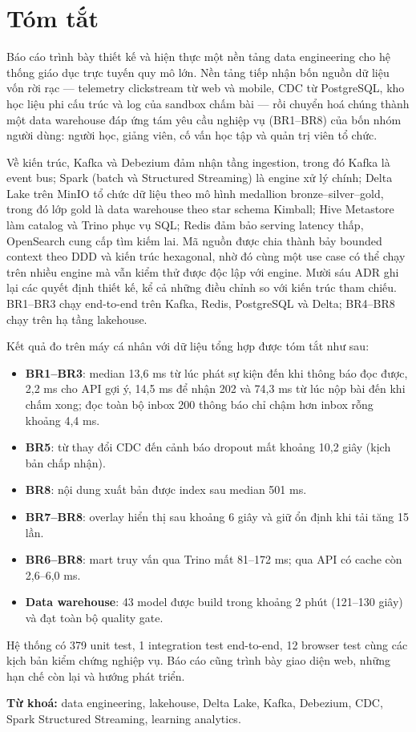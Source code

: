 \chapter*{Tóm tắt}

Báo cáo trình bày thiết kế và hiện thực một nền tảng data engineering cho hệ thống giáo dục trực tuyến quy mô lớn. Nền tảng tiếp nhận bốn nguồn dữ liệu vốn rời rạc --- telemetry clickstream từ web và mobile, CDC từ PostgreSQL, kho học liệu phi cấu trúc và log của sandbox chấm bài --- rồi chuyển hoá chúng thành một data warehouse đáp ứng tám yêu cầu nghiệp vụ (BR1--BR8) của bốn nhóm người dùng: người học, giảng viên, cố vấn học tập và quản trị viên tổ chức.

Về kiến trúc, Kafka và Debezium đảm nhận tầng ingestion, trong đó Kafka là event bus; Spark (batch và Structured Streaming) là engine xử lý chính; Delta Lake trên MinIO tổ chức dữ liệu theo mô hình medallion bronze--silver--gold, trong đó lớp gold là data warehouse theo star schema Kimball; Hive Metastore làm catalog và Trino phục vụ SQL; Redis đảm bảo serving latency thấp, OpenSearch cung cấp tìm kiếm lai. Mã nguồn được chia thành bảy bounded context theo DDD và kiến trúc hexagonal, nhờ đó cùng một use case có thể chạy trên nhiều engine mà vẫn kiểm thử được độc lập với engine. Mười sáu ADR ghi lại các quyết định thiết kế, kể cả những điều chỉnh so với kiến trúc tham chiếu. BR1--BR3 chạy end-to-end trên Kafka, Redis, PostgreSQL và Delta; BR4--BR8 chạy trên hạ tầng lakehouse.

Kết quả đo trên máy cá nhân với dữ liệu tổng hợp được tóm tắt như sau:
\begin{itemize}
  \item \textbf{BR1--BR3}: median 13{,}6 ms từ lúc phát sự kiện đến khi thông báo đọc được, 2{,}2 ms cho API gợi ý, 14{,}5 ms để nhận 202 và 74{,}3 ms từ lúc nộp bài đến khi chấm xong; đọc toàn bộ inbox 200 thông báo chỉ chậm hơn inbox rỗng khoảng 4{,}4 ms.
  \item \textbf{BR5}: từ thay đổi CDC đến cảnh báo dropout mất khoảng 10{,}2 giây (kịch bản chấp nhận).
  \item \textbf{BR8}: nội dung xuất bản được index sau median 501 ms.
  \item \textbf{BR7--BR8}: overlay hiển thị sau khoảng 6 giây và giữ ổn định khi tải tăng 15 lần.
  \item \textbf{BR6--BR8}: mart truy vấn qua Trino mất 81--172 ms; qua API có cache còn 2{,}6--6{,}0 ms.
  \item \textbf{Data warehouse}: 43 model được build trong khoảng 2 phút (121--130 giây) và đạt toàn bộ quality gate.
\end{itemize}
Hệ thống có 379 unit test, 1 integration test end-to-end, 12 browser test cùng các kịch bản kiểm chứng nghiệp vụ. Báo cáo cũng trình bày giao diện web, những hạn chế còn lại và hướng phát triển.

\vspace{3pt}
{\small\textbf{Từ khoá:} data engineering, lakehouse, Delta Lake, Kafka, Debezium, CDC, Spark Structured Streaming, learning analytics.}
